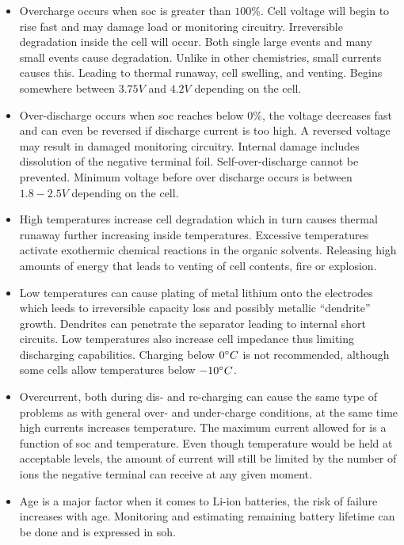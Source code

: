 \begin{itemize}
\item Overcharge occurs when \gls{soc} is greater than $100\%$. Cell voltage will begin to rise fast and may damage load or monitoring circuitry. Irreversible degradation inside the cell will occur. Both single large events and many small events cause degradation. Unlike in other chemistries, small currents causes this. Leading to thermal runaway, cell swelling, and venting. Begins somewhere between $3.75V$ and $4.2V$ depending on the cell.
\item Over-discharge occurs when \gls{soc} reaches below $0\%$, the voltage decreases fast and can even be reversed if discharge current is too high. A reversed voltage may result in damaged monitoring circuitry. Internal damage includes dissolution of the negative terminal foil. Self-over-discharge cannot be prevented. Minimum voltage before over discharge occurs is between $1.8-2.5V$ depending on the cell.
\item High temperatures increase cell degradation which in turn causes thermal runaway further increasing inside temperatures. Excessive temperatures activate exothermic chemical reactions in the organic solvents. Releasing high amounts of energy that leads to venting of cell contents, fire or explosion.
\item Low temperatures can cause plating of metal lithium onto the electrodes which leeds to irreversible capacity loss and possibly metallic “dendrite” growth. Dendrites can penetrate the separator leading to internal short circuits. Low temperatures also increase cell impedance thus limiting discharging capabilities. Charging below $0\degree C$ is not recommended, although some cells allow temperatures below $-10\degree C$.
\item Overcurrent, both during dis- and re-charging can cause the same type of problems as with general over- and under-charge conditions, at the same time high currents increases temperature. The maximum current allowed for is a function of \gls{soc} and temperature. Even though temperature would be held at acceptable levels, the amount of current will still be limited by the number of ions the negative terminal can receive at any given moment.
\item Age is a major factor when it comes to Li-ion batteries, the risk of failure increases with age. Monitoring and estimating remaining battery lifetime can be done and is expressed in \gls{soh}.
\end{itemize}

